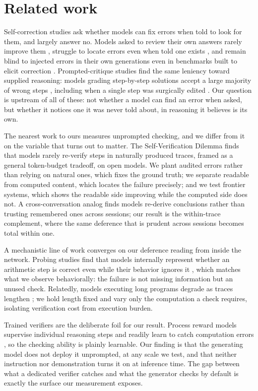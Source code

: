 \section{Related work}
\label{sec:related}

Self-correction studies ask whether models can fix errors when told to look for them, and largely answer no. Models asked to review their own answers rarely improve them \citep{huang2024}, struggle to locate errors even when told one exists \citep{tyen2024}, and remain blind to injected errors in their own generations even in benchmarks built to elicit correction \citep{tsui2025}. Prompted-critique studies find the same leniency toward supplied reasoning: models grading step-by-step solutions accept a large majority of wrong steps \citep{reflect2026,vair2026}, including when a single step was surgically edited \citep{breakingchain2026}. Our question is upstream of all of these: not whether a model can find an error when asked, but whether it notices one it was never told about, in reasoning it believes is its own.

The nearest work to ours measures unprompted checking, and we differ from it on the variable that turns out to matter. The Self-Verification Dilemma \citep{svd2026} finds that models rarely re-verify steps in naturally produced traces, framed as a general token-budget tradeoff, on open models. We plant audited errors rather than relying on natural ones, which fixes the ground truth; we separate readable from computed content, which locates the failure precisely; and we test frontier systems, which shows the readable side improving while the computed side does not. A cross-conversation analog \citep{reclaim2026} finds models re-derive conclusions rather than trusting remembered ones across sessions; our result is the within-trace complement, where the same deference that is prudent across sessions becomes total within one.

A mechanistic line of work converges on our deference reading from inside the network. Probing studies find that models internally represent whether an arithmetic step is correct even while their behavior ignores it \citep{validationgap2025}, which matches what we observe behaviorally: the failure is not missing information but an unused check. Relatedly, models executing long programs degrade as traces lengthen \citep{execdecay2026}; we hold length fixed and vary only the computation a check requires, isolating verification cost from execution burden.

Trained verifiers are the deliberate foil for our result. Process reward models supervise individual reasoning steps and readily learn to catch computation errors \citep{lightman2023}, so the checking ability is plainly learnable. Our finding is that the generating model does not deploy it unprompted, at any scale we test, and that neither instruction nor demonstration turns it on at inference time. The gap between what a dedicated verifier catches and what the generator checks by default is exactly the surface our measurement exposes.

